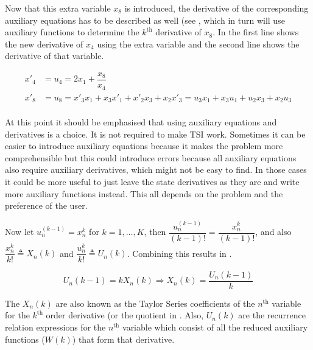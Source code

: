 \noindent
Now that this extra variable $x_{8}$ is introduced, the derivative of the corresponding auxiliary equations has to be described as well (see , which in turn will use auxiliary functions to determine the $k^{\text{th}}$ derivative of $x_{8}$. In  the first line shows the new derivative of $x_{4}$ using the extra variable and the second line shows the derivative of that variable.

\begin{equation} \label{eq:auxDerExample}
\begin{split}
x'_{4} &= u_{4} = 2x_{1}+\dfrac{x_{8}}{x_{4}} \\
x'_{8} &= u_{8} =  x'_{3}x_{1}+x_{3}x'_{1}+x'_{2}x_{3}+x_{2}x'_{3} = u_{3}x_{1}+x_{3}u_{1}+u_{2}x_{3}+x_{2}u_{3} \\
\end{split}
\end{equation}

\noindent
At this point it should be emphasised that using auxiliary equations and derivatives is a choice. It is not required to make \ac{TSI} work. Sometimes it can be easier to introduce auxiliary equations because it makes the problem more comprehensible but this could introduce errors because all auxiliary equations also require auxiliary derivatives, which might not be easy to find. In those cases it could be more useful to just leave the state derivatives as they are and write more auxiliary functions instead. This all depends on the problem and the preference of the user. 

\noindent
Now let $u_{n}^{\left(k-1\right)}=x_{n}^{k}$ for $k=1,\dots,K$, then $\dfrac{u_{n}^{\left(k-1\right)}}{\left(k-1\right)!}=\dfrac{x_{n}^{k}}{\left(k-1\right)!}$, and also $\dfrac{x_{n}^{k}}{k!}\triangleq X_{n}\left(k\right)$ and $\dfrac{u_{n}^{k}}{k!}\triangleq U_{n}\left(k\right)$. Combining this results in .

\begin{equation} \label{eq:def_u}
U_{n}\left(k-1\right)=kX_{n}\left(k\right)\Rightarrow X_{n}\left(k\right)=\dfrac{U_{n}\left(k-1\right)}{k}
\end{equation}


\noindent
The $X_{n}\left(k\right)$ are also known as the Taylor Series coefficients of the $n^{\text{th}}$ variable for the $k^{\text{th}}$ order derivative (or the quotient in . Also, $U_{n}\left(k\right)$ are the recurrence relation expressions for the $n^{\text{th}}$ variable which consist of all the reduced auxiliary functions ($W\left(k\right)$) that form that derivative. 

